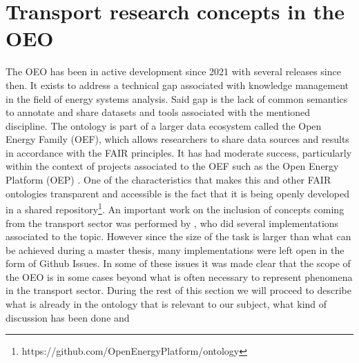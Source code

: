 \section{Transport research concepts in the OEO}

The OEO has been in active development since 2021 with several releases since
then. It exists to address a technical gap associated with knowledge management
in the field of energy systems analysis. Said gap is the lack of common
semantics to annotate and share datasets and tools associated with the
mentioned discipline. The ontology is part of a larger data ecosystem called
the Open Energy Family (OEF), which allows researchers to share data sources
and results in accordance with the FAIR principles. It has had moderate
success, particularly within the context of projects associated to the OEF such
as the Open Energy Platform (OEP) \cite{Hulk.2024}. One of the characteristics
that makes this and other FAIR ontologies transparent and accessible is the
fact that it is being openly developed in a shared
repository\footnote{https://github.com/OpenEnergyPlatform/ontology}. An
important work on the inclusion of concepts coming from the transport sector
was performed by \cite{Mittermeier.2023}, who did several implementations
associated to the topic. However since the size of the task is larger than what
can be achieved during a master thesis, many implementations were left open in
the form of Github Issues. In some of these issues it was made clear that the
scope of the OEO is in some cases beyond what is often necessary to represent
phenomena in the transport sector. During the rest of this section we will
proceed to describe what is already in the ontology that is relevant to our
subject, what kind of discussion has been done and

